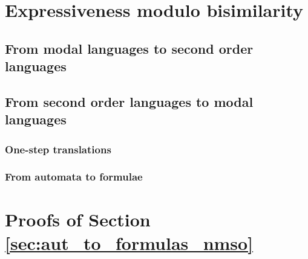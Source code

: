 \documentclass[prodmode,acmtecs]{acmsmall} %
\begin{document}




\clearpage

\section{Expressiveness modulo bisimilarity}\label{sec:expresso}

\subsection{From modal languages to second order languages}

\subsection{From second order languages to modal languages}



\subsubsection{One-step translations}\label{pinvariant-fragment}


\subsubsection{From automata to formulae}\label{aut-to-formula}







\clearpage


\appendix

\section{Proofs of Section \ref{sec:aut_to_formulas_nmso}}\label{app:nmso-aut-to-formulas}



\end{document}
